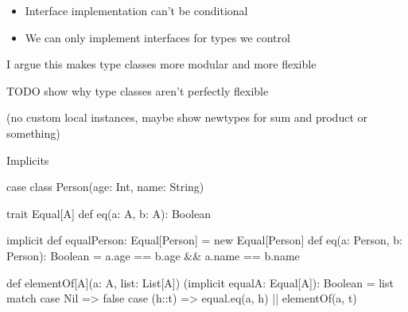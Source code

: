 \documentclass[usenames,dvipsnames,svgnames,table,aspectratio=169,mathserif]{beamer}
\newcommand{\nl}{\vspace{\baselineskip}}
\newcommand{\pnl}{\pause \nl}
\begin{document}
\begin{frame}
\begin{itemize}
\item Interface implementation can't be conditional
\item We can only implement interfaces for types we control
\end{itemize}

\nl

I argue this makes type classes more modular and more flexible
\end{frame}


\begin{frame}
TODO show why type classes aren't perfectly flexible

(no custom local instances, maybe show newtypes for sum and product or something)
\end{frame}



\begin{frame}
\begin{center}
\huge{Implicits}
\end{center}
\end{frame}


\begin{frame}[fragile]
\begin{scalacode}
case class Person(age: Int, name: String)
\end{scalacode}

\pnl

\begin{scalacode}
trait Equal[A] {
  def eq(a: A, b: A): Boolean
}
\end{scalacode}

\pnl

\begin{scalacode}
implicit def equalPerson: Equal[Person] = new Equal[Person] {
  def eq(a: Person, b: Person): Boolean =
    a.age == b.age && a.name == b.name
}
\end{scalacode}
\end{frame}


\begin{frame}[fragile]
\begin{scalacode}
def elementOf[A](a: A, list: List[A])
                (implicit equalA: Equal[A]): Boolean = {
  list match {
    case Nil => false
    case (h::t) => equal.eq(a, h) || elementOf(a, t)
  }
}
\end{scalacode}
\end{frame}
\end{document}
